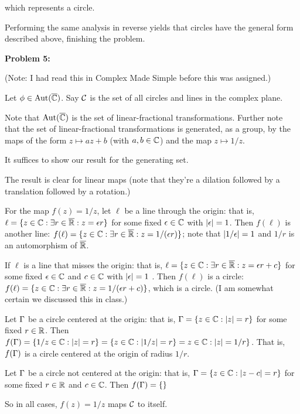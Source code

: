 \documentclass[a4paper,12pt]{article}
\begin{document}
which represents a circle.

Performing the same analysis in reverse yields that circles have the general form described above, finishing the problem. 

\shunt

{\bf Problem 5:}

(Note: I had read this in Complex Made Simple before this was assigned.)

Let $\phi \in \text{Aut}(\overline{\mathbb{C}})$. Say $\mathcal{C}$ is the set of all circles and lines in the complex plane.

Note that $\text{Aut}(\overline{\mathbb{C}})$ is the set of linear-fractional transformations. Further note that the set of linear-fractional transformations is generated, as a group, by the maps of the form $z \mapsto az+b$ (with $a,b \in \mathbb{C}$) and the map $z \mapsto 1/z$.

It suffices to show our result for the generating set.

The result is clear for linear maps (note that they're a dilation followed by a translation followed by a rotation.) 

For the map $f(z) = 1/z$, let $\ell$ be a line through the origin: that is, $\ell = \{z \in \mathbb{C}: \exists r \in \overline{\mathbb{R}}: z=\epsilon r\}$ for some fixed $\epsilon \in \mathbb{C}$ with $\left\lvert \epsilon \right\rvert = 1$. Then $f(\ell)$ is another line: $f(\ell) = \{z \in \mathbb{C}: \exists r \in \overline{\mathbb{R}}: z=1/(\epsilon r)\}$; note that $\left\lvert 1/\epsilon \right\rvert = 1$ and $1/r$ is an automorphism of $\overline{\mathbb{R}}$. 

If $\ell$ is a line that misses the origin: that is, $\ell = \{z \in \mathbb{C}: \exists r \in \overline{\mathbb{R}}: z=\epsilon r+ c\}$ for some fixed $\epsilon \in \mathbb{C}$ and $c \in \mathbb{C}$ with $\left\lvert \epsilon \right\rvert = 1$ . Then $f(\ell)$ is a circle: $f(\ell) = \{z \in \mathbb{C}: \exists r \in \overline{\mathbb{R}}: z = 1/(\epsilon r + c)\}$, which is a circle. (I am somewhat certain we discussed this in class.)  

Let $\Gamma$ be a circle centered at the origin: that is, $\Gamma = \{z \in \mathbb{C}: \left\lvert z \right\rvert = r\}$ for some fixed $r \in \mathbb{R}$. Then $f(\Gamma) = \{1/z \in \mathbb{C}: \left\lvert z \right\rvert = r\} = \{z \in \mathbb{C}: \left\lvert 1/z \right\rvert = r\} = z \in \mathbb{C}: \left\lvert z \right\rvert = 1/r\}$. That is, $f(\Gamma)$ is a circle centered at the origin of radius $1/r$.

Let $\Gamma$ be a circle not centered at the origin: that is, $\Gamma = \{z \in \mathbb{C}: \left\lvert z-c \right\rvert = r\}$ for some fixed $r \in \mathbb{R}$ and $c \in \mathbb{C}$. Then $f(\Gamma) =\{\}$ %

So in all cases, $f(z) = 1/z$ maps $\mathcal{C}$ to itself.
\end{document}
